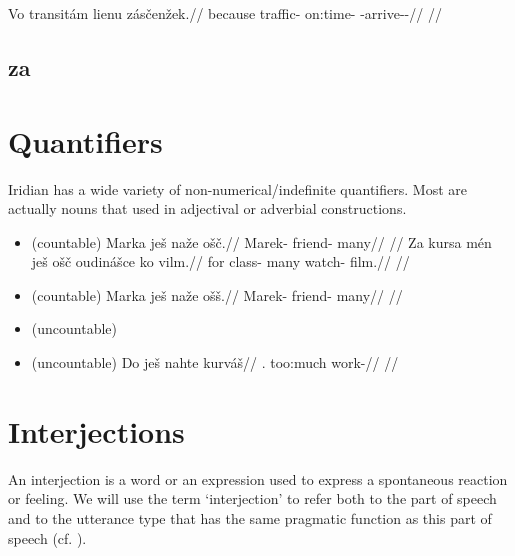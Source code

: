 \pex
\begingl
\gla Vo transitám lienu zásčenžek.//
\glb because traffic-\Agt{} on:time-\Ins{} \Neg{}-arrive-\Av{}-\Pf{}//
\glft {}//
\endgl
\xe

\subsection{za}

\section{Quantifiers}
Iridian has a wide variety of non-numerical/indefinite quantifiers.  Most are actually nouns that used in adjectival or adverbial constructions.


\begin{itemize}
    \item {}  (countable)
    \ex
    \begingl
    \gla Marka ješ naže ošč.//
    \glb Marek-\Acc{} \Exst{} friend-\Gen{} many//
    \glft {}//
    \endgl
    \xe
    \ex
    \begingl
    \gla Za kursa mén ješ ošč oudinášce ko vilm.//
    \glb for class-\Acc{}  \Exst{} many watch-\Sup{} \Att{} film.//
    \glft {}//
    \endgl
    \xe
    \item {}  (countable)
    \ex
    \begingl
    \gla Marka ješ naže ošš.//
    \glb Marek-\Acc{} \Exst{} friend-\Gen{} many//
    \glft {}//
    \endgl
    \xe
    \item {}  (uncountable)
    \item {}  (uncountable)
    \ex
    \begingl
    \gla Do ješ nahte kurváš//
    \glb \First{}\Sg{}.\Acc{} \Exst{} too:much work-\SupN{}//
    \glft {}//
    \endgl
    \xe

\end{itemize}

\section{Interjections}

An interjection is a word or an expression used to express a spontaneous reaction or feeling. We will use the term `interjection' to refer both to the part of speech and to the utterance type that has the same pragmatic function as this part of speech (cf. \cite{ameka1992}).

